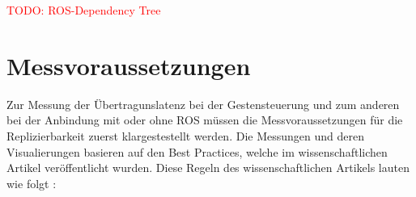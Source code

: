 \textcolor{red}{TODO: ROS-Dependency Tree}\\


\section{Messvoraussetzungen}
Zur Messung der Übertragunslatenz bei der Gestensteuerung und zum anderen bei der Anbindung mit oder ohne ROS müssen die Messvoraussetzungen für die Replizierbarkeit zuerst klargestestellt werden. Die Messungen und deren Visualierungen basieren auf den Best Practices, welche im wissenschaftlichen Artikel  veröffentlicht wurden. Diese Regeln des wissenschaftlichen Artikels lauten wie folgt \cite{kass_ten_2016}:
